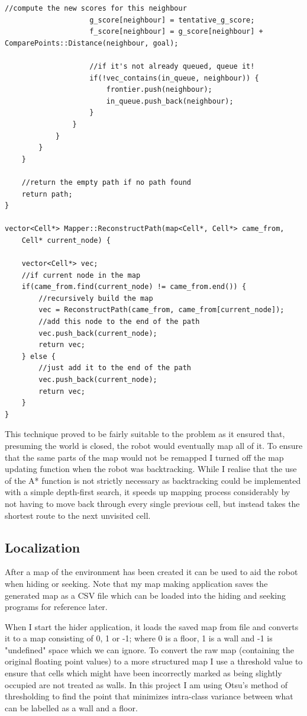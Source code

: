 \documentclass{article}
\begin{document}
\begin{lstlisting}[style=customcpp, caption=A* search algorithm used in path finding and mapping.]
					//compute the new scores for this neighbour
					g_score[neighbour] = tentative_g_score;
					f_score[neighbour] = g_score[neighbour] + ComparePoints::Distance(neighbour, goal);

					//if it's not already queued, queue it!
					if(!vec_contains(in_queue, neighbour)) {
						frontier.push(neighbour);
						in_queue.push_back(neighbour);
					}
				}
			}
		}
	}

	//return the empty path if no path found
	return path;
}

vector<Cell*> Mapper::ReconstructPath(map<Cell*, Cell*> came_from, 
	Cell* current_node) {

	vector<Cell*> vec;
	//if current node in the map
	if(came_from.find(current_node) != came_from.end()) {
		//recursively build the map
		vec = ReconstructPath(came_from, came_from[current_node]);
		//add this node to the end of the path
		vec.push_back(current_node);
		return vec;
	} else {
		//just add it to the end of the path
		vec.push_back(current_node);
		return vec;
	}
}
\end{lstlisting}

This technique proved to be fairly suitable to the problem as it ensured that, presuming the world is closed, the robot would eventually map all of it. To ensure that the same parts of the map would not be remapped I turned off the map updating function when the robot was backtracking. While I realise that the use of the A* function is not strictly necessary as backtracking could be implemented with a simple depth-first search, it speeds up mapping process considerably by not having to move back through every single previous cell, but instead takes the shortest route to the next unvisited cell.

\subsection{Localization}
After a map of the environment has been created it can be used to aid the robot when hiding or seeking. Note that my map making application saves the generated map as a CSV file which can be loaded into the hiding and seeking programs for reference later.

When I start the hider application, it loads the saved map from file and converts it to a map consisting of 0, 1 or -1; where 0 is a floor, 1 is a wall and -1 is "undefined" space which we can ignore. To convert the raw map (containing the original floating point values) to a more structured map I use a threshold value to ensure that cells which might have been incorrectly marked as being slightly occupied are not treated as walls. In this project I am using Otsu's method of thresholding to find the point that minimizes intra-class variance between what can be labelled as a wall and a floor.
\end{document}
